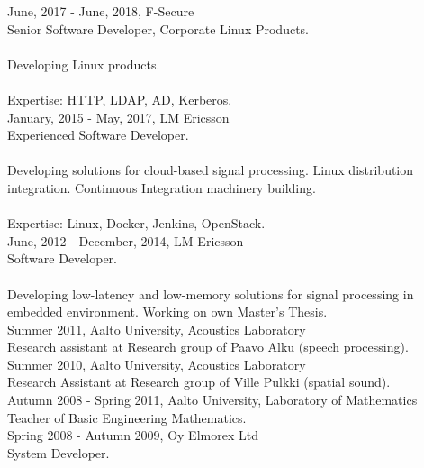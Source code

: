 \documentclass[12pt]{article}
\begin{document}
\large{June, 2017 - June, 2018, F-Secure}\\
\normalsize{Senior Software Developer, Corporate Linux Products.}\\
\\
\normalsize{Developing Linux products.}\\
\\
\normalsize{Expertise: HTTP, LDAP, AD, Kerberos.}\\

\large{January, 2015 - May, 2017, LM Ericsson}\\
\normalsize{Experienced Software Developer.}\\
\\
\normalsize{Developing solutions for cloud-based signal processing. Linux distribution integration. Continuous Integration machinery building.}\\
\\
\normalsize{Expertise: Linux, Docker, Jenkins, OpenStack.}\\

\large{June, 2012 - December, 2014, LM Ericsson}\\
\normalsize{Software Developer.}\\
\\
\normalsize{Developing low-latency and low-memory solutions for signal processing in embedded environment. Working on own Master's Thesis.}\\

\large{Summer 2011, Aalto University, Acoustics Laboratory}\\
\normalsize{Research assistant at Research group of Paavo Alku (speech
processing).}\\

\large{Summer 2010, Aalto University, Acoustics Laboratory}\\
\normalsize{Research Assistant at Research group of Ville Pulkki (spatial
sound).}\\

\large{Autumn 2008 - Spring 2011, Aalto University, Laboratory of Mathematics}\\
\normalsize{Teacher of Basic Engineering Mathematics.}\\

\large{Spring 2008 - Autumn 2009, Oy Elmorex Ltd}\\
\normalsize{System Developer.}\\

\end{document}
